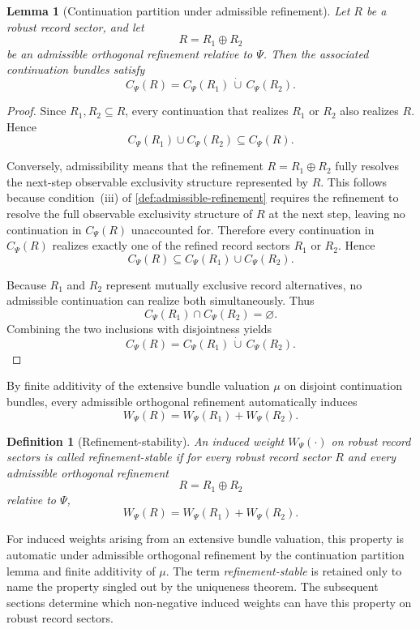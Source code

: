 \documentclass[11pt]{article}
\newtheorem{definition}{Definition}
\newtheorem{lemma}{Lemma}
\theoremstyle{remark}
\numberwithin{equation}{section}
\newcommand{\Cpsi}[1]{C_{\Psi}\!\left(#1\right)}
\newcommand{\Wpsi}[1]{W_{\Psi}\!\left(#1\right)}
\begin{document}
\begin{lemma}[Continuation partition under admissible refinement]
Let $R$ be a robust record sector, and let
\[
R = R_1 \oplus R_2
\]
be an admissible orthogonal refinement relative to \(\Psi\). Then the associated continuation bundles satisfy
\[
\Cpsi{R} = \Cpsi{R_1} \,\dot\cup\, \Cpsi{R_2}.
\]
\end{lemma}

\begin{proof}
Since $R_1,R_2 \subseteq R$, every continuation that realizes $R_1$ or $R_2$ also realizes $R$. Hence
\[
\Cpsi{R_1} \cup \Cpsi{R_2} \subseteq \Cpsi{R}.
\]

Conversely, admissibility means that the refinement $R = R_1 \oplus R_2$ fully resolves the next-step observable exclusivity structure represented by $R$. This follows because condition~(iii) of \cref{def:admissible-refinement} requires the refinement to resolve the full observable exclusivity structure of $R$ at the next step, leaving no continuation in $\Cpsi{R}$ unaccounted for. Therefore every continuation in $\Cpsi{R}$ realizes exactly one of the refined record sectors $R_1$ or $R_2$. Hence
\[
\Cpsi{R} \subseteq \Cpsi{R_1} \cup \Cpsi{R_2}.
\]

Because $R_1$ and $R_2$ represent mutually exclusive record alternatives, no admissible continuation can realize both simultaneously. Thus
\[
\Cpsi{R_1} \cap \Cpsi{R_2} = \varnothing.
\]
Combining the two inclusions with disjointness yields
\[
\Cpsi{R} = \Cpsi{R_1} \,\dot\cup\, \Cpsi{R_2}.
\]
\end{proof}

By finite additivity of the extensive bundle valuation $\mu$ on
disjoint continuation bundles, every admissible orthogonal refinement
automatically induces
\[
\Wpsi{R} = \Wpsi{R_1} + \Wpsi{R_2}.
\]

\begin{definition}[Refinement-stability]
\label{def:refinement-stability}
An induced weight $\Wpsi{\cdot}$ on robust record sectors is called
\emph{refinement-stable} if for every robust record sector $R$ and
every admissible orthogonal refinement
\[
  R = R_1 \oplus R_2
\]
relative to $\Psi$,
\[
  \Wpsi{R} = \Wpsi{R_1} + \Wpsi{R_2}.
\]
\end{definition}

For induced weights arising from an extensive bundle valuation, this
property is automatic under admissible orthogonal refinement by the
continuation partition lemma and finite additivity of $\mu$. The term
\emph{refinement-stable} is retained only to name the property singled
out by the uniqueness theorem. The subsequent sections determine which
non-negative induced weights can have this property on robust record
sectors.
\end{document}
